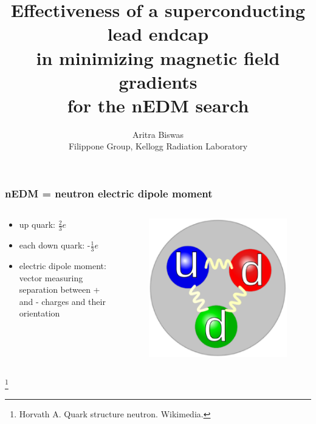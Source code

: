 \documentclass[handout]{beamer}
\newcommand{\bottomcite}{\let\thefootnote\relax\footnote}
\begin{document}

\title{Effectiveness of a superconducting lead endcap\\ in minimizing magnetic field gradients\\ for the nEDM search}
\author{Aritra Biswas\\Filippone Group, Kellogg Radiation Laboratory}
\maketitle

\begin{frame}
\frametitle{nEDM = neutron electric dipole moment}

    \begin{columns}

    \begin{column}{0.5\textwidth}
    \begin{itemize}
        \item up quark: $\frac{2}{3} e$
        \item each down quark: -$\frac{1}{3} e$
        \item electric dipole moment: vector measuring separation between + and - charges
              and their orientation
    \end{itemize}
    \end{column}
    
    \begin{column}{0.5\textwidth}
    \begin{figure}
    \includegraphics[width=\textwidth]{figures/neutron_quarks.eps}
    \end{figure}
    \end{column}

    \end{columns}

    \bottomcite{Horvath A. Quark structure neutron. Wikimedia.}

\end{frame}
\end{document}
